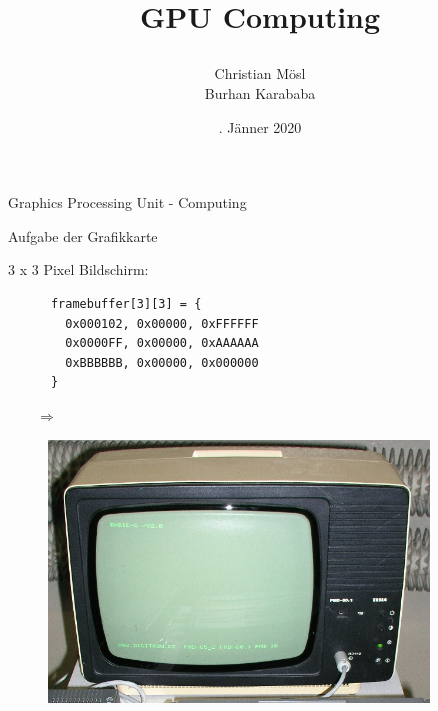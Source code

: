 \documentclass[10pt,aspectratio=169]{beamer}
\title{\centerline{\huge GPU Computing}}
\date{\centering 10. J\"anner 2020}
\author{\centerline{\large Christian M\"osl \\ Burhan Karababa}}
\institute{\centering \vspace*{0.5em} Department of Computer Sciences \\ University of Salzburg}
\begin{document}
\maketitle

\begin{frame}[standout]
    \alert{G}raphics \alert{P}rocessing \alert{U}nit - Computing
\end{frame}

\begin{frame}[fragile]{Aufgabe der Grafikkarte}
\begin{minipage}[t]{0.3\textwidth}
3 x 3 Pixel Bildschirm:
\begin{small}
    \begin{verbatim}
      framebuffer[3][3] = { 
        0x000102, 0x00000, 0xFFFFFF 
        0x0000FF, 0x00000, 0xAAAAAA
        0xBBBBBB, 0x00000, 0x000000 
      }
    \end{verbatim}
\end{small}
\end{minipage}
\begin{minipage}[t]{0.3\textwidth}
\vspace{1.5cm}
\begin{center}
\Huge $\qquad \Rightarrow$
\end{center}
\end{minipage}
\begin{minipage}[t]{0.3\textwidth}
\begin{figure}[ht]
    \begin{center}
        \includegraphics[width=0.9\textwidth]{crt.jpg}
    \end{center}
\end{figure}
\end{minipage}
\end{frame}
\end{document}
